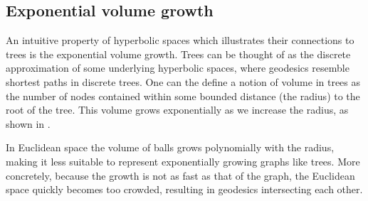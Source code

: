\subsection{Exponential volume growth}
An intuitive property of hyperbolic spaces which illustrates their connections to trees is the exponential volume growth. Trees can be thought of as the discrete approximation of some underlying hyperbolic spaces, where geodesics resemble shortest paths in discrete trees. One can the define a notion of volume in trees as the number of nodes contained within some bounded distance (the radius) to the root of the tree. This volume grows exponentially as we increase the radius, as shown in .



In Euclidean space the volume of balls grows polynomially with the radius, making it less suitable to represent exponentially growing graphs like trees. More concretely, because the growth is not as fast as that of the graph, the Euclidean space quickly becomes too crowded, resulting in geodesics intersecting each other.





